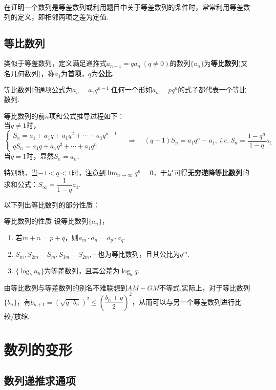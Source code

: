 \documentclass[lang=cn, zihao=4.5]{elegantbook}
\newcommand{\ssb}[1]{\left( #1 \right)}
\begin{document}
在证明一个数列是等差数列或利用题目中关于等差数列的条件时，常常利用等差数列的定义，即相邻两项之差为定值.

\subsection{等比数列}

类似于等差数列，定义满足递推式$a_{n+1}=qa_n ~(q \neq 0)$的数列$\{ a_n \}$为\textbf{等比数列}(又名几何数列)，称$a_1$为\textbf{首项}，$q$为\textbf{公比}.

等比数列的通项公式为$a_n = a_1 q^{n-1}$.任何一个形如$a_n=pq^n$的式子都代表一个等比数列.

等比数列的前$n$项和公式推导过程如下： \\
当$q \neq 1$时，
$$\begin{cases}
	S_n = a_1 + a_1q + a_1q^2 + \cdots + a_1q^{n-1} \\
	qS_n = a_1q + a_1q^2 + \cdots + a_1q^{n} 
\end{cases}
\quad \Longrightarrow \quad
(q-1)S_n = a_1q^{n} - a_1,~i.e.~S_n = \frac{1-q^n}{1-q} a_1
$$
当$q = 1$时，显然$S_n = a_n$.

特别地，当$-1<q<1$时，注意到$\lim _{n \to \infty} q^n=0$，于是可得\textbf{无穷递降等比数列}的求和公式：$S_{\infty} = \dfrac{1}{1-q}a_1$.

以下列出等比数列的部分性质：

\begin{proposition}{等比数列的性质}
	设等比数列$\{ a_n \}$，
	\begin{enumerate}
		\item 若$m+n=p+q$，则$a_m \cdot a_n = a_p \cdot a_q$.
		\item $S_m,S_{2m}-S_m,S_{3m}-S_{2m},\cdots $也为等比数列，且其公比为$q^{m}$.
		\item $\{ \log _{b}{a_n} \}$为等差数列，且其公差为$\log _{b}{q}$.
	\end{enumerate}
\end{proposition}

由等比数列与等差数列的别名不难联想到$AM-GM$不等式.实际上，对于等比数列$\{ b_n \}$，有$b_{n+1} = (\sqrt{q \cdot b_n})^2 \leq \ssb{\dfrac{b_n+q}{2}}^2$，从而可以与另一个等差数列进行比较/放缩.

\section{数列的变形}

\subsection{数列递推求通项}
\end{document}
